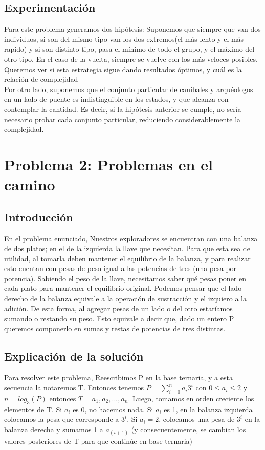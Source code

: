 \documentclass[spanish,12pt]{article}
\begin{document}
\subsection{Experimentación}
Para este problema generamos dos hipótesis:
Suponemos que siempre que van dos individuos, si son del mismo tipo van los dos extremos(el más lento y el más rapido) y si son distinto tipo, pasa el mínimo de todo el grupo, y el máximo del otro tipo.
En el caso de la vuelta, siempre se vuelve con los más veloces posibles.
Queremos ver si esta estrategia sigue dando resultados óptimos, y cuál es la relación de complejidad
\\
Por otro lado, suponemos que el conjunto particular de caníbales y arquéologos en un lado de puente es indistinguible en los estados, y que alcanza con contemplar la cantidad. Es decir, si la hipótesis anterior se cumple, no sería necesario probar cada conjunto particular, reduciendo considerablemente la complejidad.



\section{Problema 2: Problemas en el camino}

\subsection{Introducción}

En el problema enunciado, Nuestros exploradores se encuentran con una balanza de dos platos; en el de la izquierda la llave que necesitan. Para que esta sea de utilidad, al tomarla deben mantener el equilibrio de la balanza, y para realizar esto cuentan con pesas de peso igual a las potencias de tres (una pesa por potencia).
Sabiendo el peso de la llave, necesitamos saber qué pesas poner en cada plato para mantener el equilibrio original.
Podemos pensar que el lado derecho de la balanza equivale a la operación de sustracción y el izquiero a la adición. De esta forma, al agregar pesas de un lado o del otro estaríamos sumando o restando su peso.
Esto equivale a decir que, dado un entero P queremos componerlo en sumas y restas de potencias de tres distintas.

\subsection{Explicación de la solución}

Para resolver este problema, Reescribimos P en la base ternaria, y a esta secuencia la notaremos T. Entonces tenemos $P = \sum_{i=0}^{n} a_i3^i$  con $0 \leq a_i \leq 2$ y $n = log_{3}{(P)}$  entonces $T ={a_1,a_2,...,a_n}$.
Luego, tomamos en orden creciente los elementos de T. Si $a_i$ es 0, no hacemos nada. Si $a_i$ es 1, en la balanza izquierda colocamos la pesa que corresponde a $3^i$. Si $a_i =2$, colocamos una pesa de $3^i$ en la balanza derecha y sumamos 1 a $a_{(i+1)}$ (y consecuentemente, se cambian los valores posteriores de T para que continúe en base ternaria)
\end{document}
